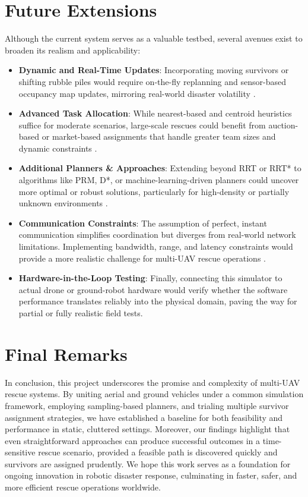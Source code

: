 \documentclass[12pt,a4paper]{report}
\begin{document}
\section{Future Extensions}
Although the current system serves as a valuable testbed, several avenues exist to
broaden its realism and applicability:
\begin{itemize}
    \item \textbf{Dynamic and Real-Time Updates}: Incorporating moving survivors or
          shifting rubble piles would require on-the-fly replanning and sensor-based
          occupancy map updates, mirroring real-world disaster volatility \cite{Oleynikova2018ReplanDynamic}.
    \item \textbf{Advanced Task Allocation}: While nearest-based and centroid heuristics
          suffice for moderate scenarios, large-scale rescues could benefit from auction-based
          or market-based assignments that handle greater team sizes and dynamic constraints \cite{Dias2006MarketBased}.
    \item \textbf{Additional Planners \& Approaches}: Extending beyond RRT or RRT*
          to algorithms like PRM, D*, or machine-learning-driven planners could
          uncover more optimal or robust solutions, particularly for high-density
          or partially unknown environments \cite{Orthey2024SBMPReview}.
    \item \textbf{Communication Constraints}: The assumption of perfect, instant
          communication simplifies coordination but diverges from real-world
          network limitations. Implementing bandwidth, range, and latency constraints
          would provide a more realistic challenge for multi-UAV rescue operations \cite{Dias2006MarketBased}.
    \item \textbf{Hardware-in-the-Loop Testing}: Finally, connecting this simulator
          to actual drone or ground-robot hardware would verify whether the software
          performance translates reliably into the physical domain, paving the way
          for partial or fully realistic field tests.
\end{itemize}

\section{Final Remarks}
In conclusion, this project underscores the promise and complexity of multi-UAV rescue
systems. By uniting aerial and ground vehicles under a common simulation framework,
employing sampling-based planners, and trialing multiple survivor assignment strategies,
we have established a baseline for both feasibility and performance in static, cluttered
settings. Moreover, our findings highlight that even straightforward approaches can
produce successful outcomes in a time-sensitive rescue scenario, provided a feasible
path is discovered quickly and survivors are assigned prudently. We hope this work
serves as a foundation for ongoing innovation in robotic disaster response, culminating
in faster, safer, and more efficient rescue operations worldwide.



\end{document}
